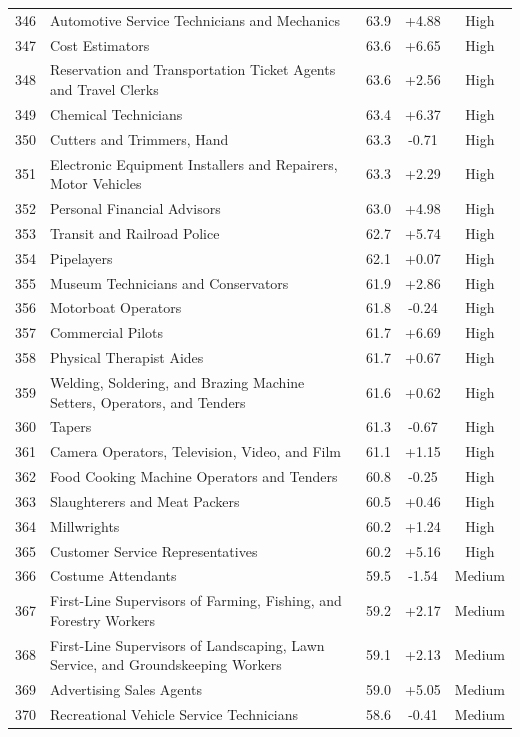 {\begin{longtable}{rp{7cm}ccc}
346 & Automotive Service Technicians and Mechanics & 63.9 & +4.88 & High \\
347 & Cost Estimators & 63.6 & +6.65 & High \\
348 & Reservation and Transportation Ticket Agents and Travel Clerks & 63.6 & +2.56 & High \\
349 & Chemical Technicians & 63.4 & +6.37 & High \\
350 & Cutters and Trimmers, Hand & 63.3 & -0.71 & High \\
351 & Electronic Equipment Installers and Repairers, Motor Vehicles & 63.3 & +2.29 & High \\
352 & Personal Financial Advisors & 63.0 & +4.98 & High \\
353 & Transit and Railroad Police & 62.7 & +5.74 & High \\
354 & Pipelayers & 62.1 & +0.07 & High \\
355 & Museum Technicians and Conservators & 61.9 & +2.86 & High \\
356 & Motorboat Operators & 61.8 & -0.24 & High \\
357 & Commercial Pilots & 61.7 & +6.69 & High \\
358 & Physical Therapist Aides & 61.7 & +0.67 & High \\
359 & Welding, Soldering, and Brazing Machine Setters, Operators, and Tenders & 61.6 & +0.62 & High \\
360 & Tapers & 61.3 & -0.67 & High \\
361 & Camera Operators, Television, Video, and Film & 61.1 & +1.15 & High \\
362 & Food Cooking Machine Operators and Tenders & 60.8 & -0.25 & High \\
363 & Slaughterers and Meat Packers & 60.5 & +0.46 & High \\
364 & Millwrights & 60.2 & +1.24 & High \\
365 & Customer Service Representatives & 60.2 & +5.16 & High \\
366 & Costume Attendants & 59.5 & -1.54 & Medium \\
367 & First-Line Supervisors of Farming, Fishing, and Forestry Workers & 59.2 & +2.17 & Medium \\
368 & First-Line Supervisors of Landscaping, Lawn Service, and Groundskeeping Workers & 59.1 & +2.13 & Medium \\
369 & Advertising Sales Agents & 59.0 & +5.05 & Medium \\
370 & Recreational Vehicle Service Technicians & 58.6 & -0.41 & Medium \\

\end{longtable}}
